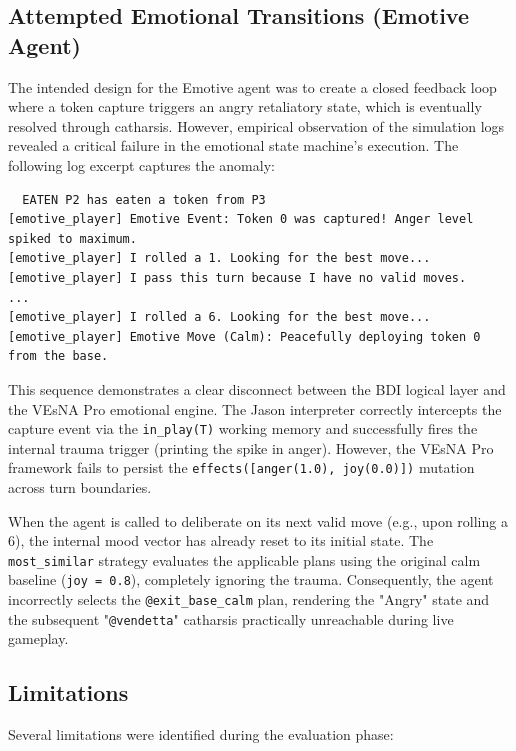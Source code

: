 \documentclass[12pt]{article}
\begin{document}
\subsection{Attempted Emotional Transitions (Emotive Agent)}
\label{subsec:emotional}
\noindent The intended design for the Emotive agent was to create a closed feedback loop where a token capture triggers an angry retaliatory state, which is eventually resolved through catharsis. However, empirical observation of the simulation logs revealed a critical failure in the emotional state machine's execution. The following log excerpt captures the anomaly:
\pagebreak
\begin{lstlisting}
  EATEN P2 has eaten a token from P3
[emotive_player] Emotive Event: Token 0 was captured! Anger level spiked to maximum.
[emotive_player] I rolled a 1. Looking for the best move...
[emotive_player] I pass this turn because I have no valid moves.
...
[emotive_player] I rolled a 6. Looking for the best move...
[emotive_player] Emotive Move (Calm): Peacefully deploying token 0 from the base.
\end{lstlisting}

\noindent This sequence demonstrates a clear disconnect between the BDI logical layer and the VEsNA Pro emotional engine. The Jason interpreter correctly intercepts the capture event via the \texttt{in\_play(T)} working memory and successfully fires the internal trauma trigger (printing the spike in anger). However, the VEsNA Pro framework fails to persist the \texttt{effects([anger(1.0), joy(0.0)])} mutation across turn boundaries. 

\noindent When the agent is called to deliberate on its next valid move (e.g., upon rolling a 6), the internal mood vector has already reset to its initial state. The \texttt{most\_similar} strategy evaluates the applicable plans using the original calm baseline (\texttt{joy = 0.8}), completely ignoring the trauma. Consequently, the agent incorrectly selects the \texttt{@exit\_base\_calm} plan, rendering the "Angry" state and the subsequent "\texttt{@vendetta}" catharsis practically unreachable during live gameplay.


\subsection{Limitations}
\label{subsec:limitations}
\noindent Several limitations were identified during the evaluation phase:
\end{document}
